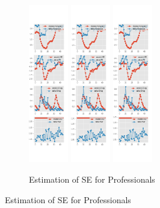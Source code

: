 \documentclass[]{article}
\begin{document}
\begin{figure}[ht]
	\centering
	\begin{subfigure}[b]{\textwidth}
		\centering
		\caption{Estimation of SE for Professionals}
		\label{SE_diag_SPF}
		\includegraphics[width=0.19\textwidth]{figures/spf_se_est_diag0.png}
		\includegraphics[width=0.19\textwidth]{figures/spf_se_est_diag1.png}
		\includegraphics[width=0.19\textwidth]{figures/spf_se_est_diag2.png}

\end{subfigure}
\end{figure}
\end{document}
